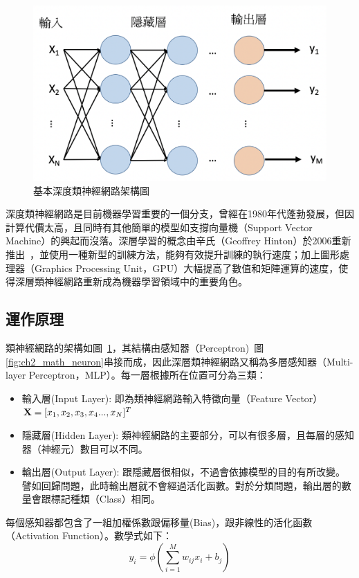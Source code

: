 \begin{figure}[h]
\centering
\includegraphics[scale=0.3]{images/ch2_DNN.png}
\caption{基本深度類神經網路架構圖} \label{fig:ch2_DNN}
\end{figure}

深度類神經網路是目前機器學習重要的一個分支，曾經在1980年代蓬勃發展，但因計算代價太高，且同時有其他簡單的模型如支撐向量機（Support
Vector Machine）的興起而沒落。深層學習的概念由辛氏（Geoffrey Hinton）於2006重新推出~\cite{hinton2006fast}，並使用一種新型的訓練方法，能夠有效提升訓練的執行速度；加上圖形處理器（Graphics
Processing
Unit，GPU）大幅提高了數值和矩陣運算的速度，使得深層類神經網路重新成為機器學習領域中的重要角色。
\subsection{運作原理}
類神經網路的架構如圖~\ref{fig:ch2_DNN}，其結構由感知器（Perceptron)~圖\ref{fig:ch2_math_neuron}串接而成，因此深層類神經網路又稱為多層感知器（Multi-layer
Perceptron，MLP）。每一層根據所在位置可分為三類：
\begin{itemize}
\item    輸入層(Input Layer): 即為類神經網路輸入特徵向量（Feature Vector） $ \bold{X} = [x_1 , x_2 , x_3 , x_4 ... , x_N]^T $ 
\item    隱藏層(Hidden Layer): 類神經網路的主要部分，可以有很多層，且每層的感知器（神經元）數目可以不同。
\item    輸出層(Output Layer): 跟隱藏層很相似，不過會依據模型的目的有所改變。譬如回歸問題，此時輸出層就不會經過活化函數。對於分類問題，輸出層的數量會跟標記種類（Class）相同。
\end{itemize}

每個感知器都包含了一組加權係數跟偏移量(Bias)，跟非線性的活化函數（Activation
Function）。數學式如下：
\begin{equation}
	y_i = \phi{(\sum_{i=1}^{M} w_{ij}x_i+b_j) }
\end{equation}

